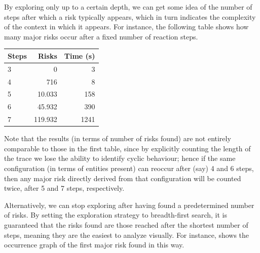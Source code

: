 \medskip\noindent By exploring only up to a certain depth, we can get some idea of the number of steps after which a risk typically appears, which in turn indicates the complexity of the context in which it appears. For instance, the following table shows how many major risks occur after a fixed number of reaction steps.

\begin{center}
\begin{tabular}{lrr}
\bf Steps & \bf Risks & Time (s) \\
\hline
3 &       0 &    3 \\
4 &     716 &    8 \\
5 &  10.033 &  158 \\
6 &  45.932 &  390 \\
7 & 119.932 & 1241 \\
\end{tabular}
\end{center}

Note that the results (in terms of number of risks found) are not entirely comparable to those in the first table, since by explicitly counting the length of the trace we lose the ability to identify cyclic behaviour; hence if the same configuration (in terms of entities present) can reoccur after (say) 4 and 6 steps, then any major risk directly derived from that configuration will be counted twice, after 5 and 7 steps, respectively.

\medskip\noindent Alternatively, we can stop exploring after having found a predetermined number of risks. By setting the exploration strategy to breadth-first search, it is guaranteed that the risks found are those reached after the shortest number of steps, meaning they are the easiest to analyze visually. For instance,  shows the occurrence graph of the first major risk found in this way.

